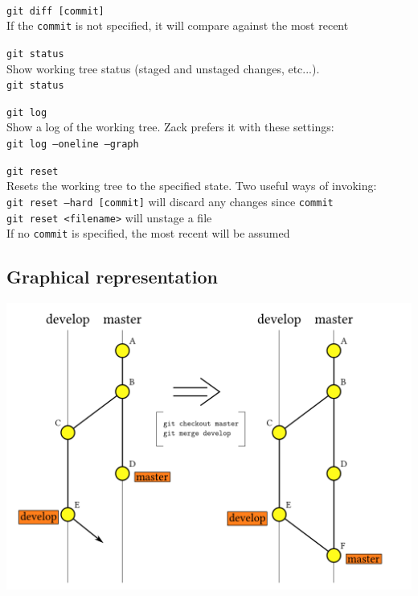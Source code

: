 \documentclass{article}
\begin{document}
\begin{description}
		\\\texttt{git diff [commit]}
		\\If the \texttt{commit} is not specified, it will compare against the most recent
	\item \texttt{git status}
		\\Show working tree status (staged and unstaged changes, etc...).
		\\\texttt{git status}
	\item \texttt{git log}
		\\Show a log of the working tree. Zack prefers it with these settings:
		\\\texttt{git log --oneline --graph}
	\item \texttt{git reset}
		\\Resets the working tree to the specified state. Two useful ways of invoking:
		\\\texttt{git reset --hard [commit]} will discard any changes since \texttt{commit}
		\\\texttt{git reset <filename>} will unstage a file
		\\If no \texttt{commit} is specified, the most recent will be assumed
\end{description}

\pagebreak

\subsection{Graphical representation}

\begin{center}
	\includegraphics[width=15cm]{commit-merge.png}
\end{center}
\end{document}
